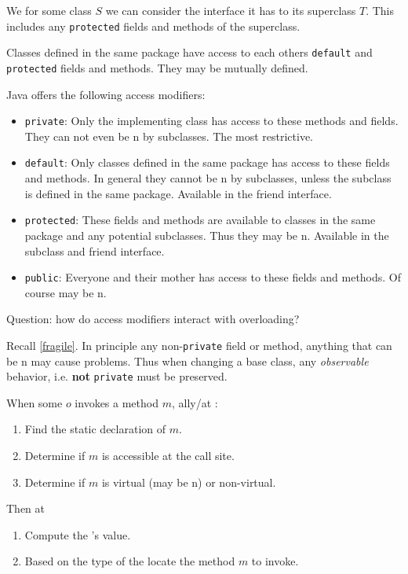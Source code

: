 \documentclass{article}
\begin{document}
\begin{example}
We for some class $S$ we can consider the interface it has to its superclass $T$.
This includes any \texttt{protected} fields and methods of the superclass.
\end{example}

\begin{example}
Classes defined in the same package have access to each others \texttt{default} and \texttt{protected} fields and methods.
They may be mutually defined.
\end{example}

Java offers the following access modifiers:
\begin{itemize}
\item \texttt{private}: Only the implementing class has access to these methods and fields. They can not even be \override{}n by subclasses. The most restrictive.
\item \texttt{default}: Only classes defined in the same package has access to these fields and methods. In general they cannot be \override{}n by subclasses, unless the subclass is defined in the same package. Available in the friend interface.
\item \texttt{protected}: These fields and methods are available to classes in the same package and any potential subclasses. Thus they may be \override{}n.  Available in the subclass and friend interface.
\item \texttt{public}: Everyone and their mother has access to these fields and methods. Of course may be \override{}n.
\end{itemize}

Question: how do access modifiers interact with overloading?

Recall \ref{fragile}. In principle any non-\texttt{private} field or method, anything that can be \override{}n may cause problems. Thus when changing a base class, any \textit{observable} behavior, i.e. \textbf{not} \texttt{private} must be preserved.

\begin{definition}
\label{jls1}
When some \receiver{} $o$ invokes a method $m$, \static{}ally/at \compiletime{}:
\begin{enumerate}
\item Find the static declaration of $m$.
\item Determine if $m$ is accessible at the call site.
\item Determine if $m$ is virtual (may be \override{}n) or non-virtual.
\end{enumerate}
Then at \runtime{}
\begin{enumerate}
\item Compute the \receiver{}'s value.
\item Based on the \dynamic{} type of the \receiver{} locate the method $m$ to invoke.
\end{enumerate}
\end{definition}
\end{document}
